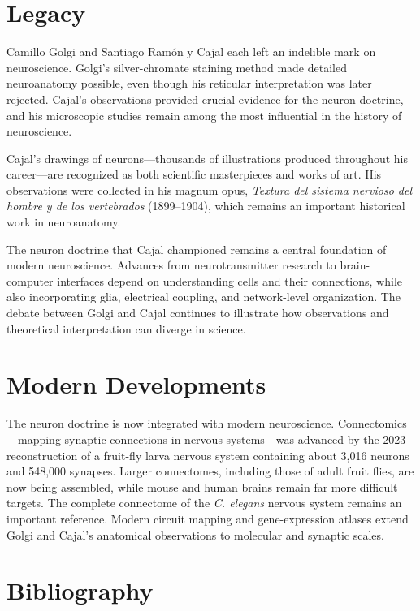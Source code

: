 \section{Legacy}

Camillo Golgi and Santiago Ram\'on y Cajal each left an indelible mark on neuroscience. Golgi's silver-chromate staining method made detailed neuroanatomy possible, even though his reticular interpretation was later rejected. Cajal's observations provided crucial evidence for the neuron doctrine, and his microscopic studies remain among the most influential in the history of neuroscience.

Cajal's drawings of neurons---thousands of illustrations produced throughout his career---are recognized as both scientific masterpieces and works of art. His observations were collected in his magnum opus, \emph{Textura del sistema nervioso del hombre y de los vertebrados} (1899--1904), which remains an important historical work in neuroanatomy.

The neuron doctrine that Cajal championed remains a central foundation of modern neuroscience. Advances from neurotransmitter research to brain-computer interfaces depend on understanding cells and their connections, while also incorporating glia, electrical coupling, and network-level organization. The debate between Golgi and Cajal continues to illustrate how observations and theoretical interpretation can diverge in science.


\section{Modern Developments}

The neuron doctrine is now integrated with modern neuroscience. Connectomics---mapping synaptic connections in nervous systems---was advanced by the 2023 reconstruction of a fruit-fly larva nervous system containing about 3,016 neurons and 548,000 synapses. Larger connectomes, including those of adult fruit flies, are now being assembled, while mouse and human brains remain far more difficult targets. The complete connectome of the \emph{C. elegans} nervous system remains an important reference. Modern circuit mapping and gene-expression atlases extend Golgi and Cajal's anatomical observations to molecular and synaptic scales.\cite{drosophila-connectome}


\section{Bibliography}

